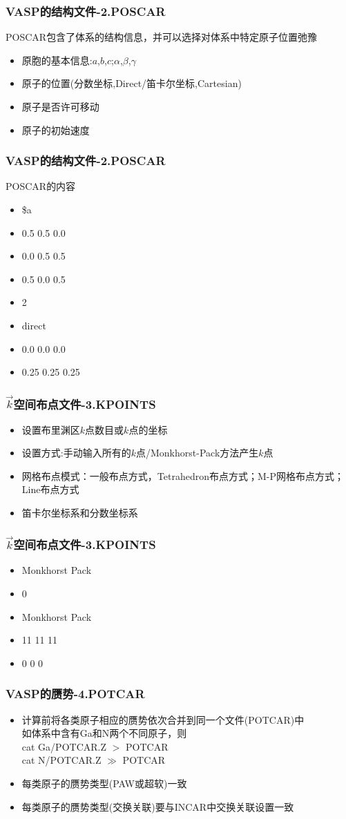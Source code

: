 \documentclass[cjk,slidestop,compress,mathserif,blue]{beamer}
\begin{document}
\frame
{
\frametitle{VASP的结构文件-2.POSCAR}
\textrm{POSCAR}包含了体系的结构信息，并可以选择对体系中特定原子位置弛豫
\begin{itemize}
   \setlength{\itemsep}{15pt}
	\item 原胞的基本信息:$a$,$b$,$c$;$\alpha$,$\beta$,$\gamma$
	\item 原子的位置(分数坐标,\textrm{Direct}/笛卡尔坐标,\textrm{Cartesian}) 
	\item 原子是否许可移动
	\item 原子的初始速度
\end{itemize}
}

\frame
{
\frametitle{VASP的结构文件-2.POSCAR}
\textrm{POSCAR}的内容
\begin{itemize}
   \setlength{\itemsep}{5pt}
   \item   \textrm{\$a}
	\item 0.5 0.5 0.0
	\item 0.0 0.5 0.5
	\item 0.5 0.0 0.5
	\item 2
	\item \textrm{direct}
	\item 0.0 0.0 0.0
	\item 0.25 0.25 0.25 
\end{itemize}
}

\frame
{
\frametitle{$\vec k$空间布点文件-3.KPOINTS}
\begin{itemize}
   \setlength{\itemsep}{15pt}
	\item 设置布里渊区$k$点数目或$k$点的坐标
	\item 设置方式:手动输入所有的$k$点/\textrm{Monkhorst-Pack}方法产生$k$点
	\item 网格布点模式：一般布点方式，\textrm{Tetrahedron}布点方式；\textrm{M-P}网格布点方式；\textrm{Line}布点方式
	\item 笛卡尔坐标系和分数坐标系
\end{itemize}
}

\frame
{
\frametitle{$\vec k$空间布点文件-3.KPOINTS}
\begin{itemize}
   \setlength{\itemsep}{5pt}
   	\item \textrm{Monkhorst Pack}
	\item 0
	\item \textrm{Monkhorst Pack}
	\item 11 11 11
	\item 0 0 0
\end{itemize}
}

\frame
{
\frametitle{VASP的赝势-4.POTCAR}
\begin{itemize}
   \setlength{\itemsep}{10pt}
	\item 计算前将各类原子相应的赝势依次合并到同一个文件(\textrm{POTCAR})中\\
		如体系中含有\textrm{Ga}和\textrm{N}两个不同原子，则\\
		\textrm{cat Ga/POTCAR.Z $>$ POTCAR}\\
		\textrm{cat N/POTCAR.Z $\gg$ POTCAR}
	\item 每类原子的赝势类型(\textrm{PAW}或超软)一致
	\item 每类原子的赝势类型(交换关联)要与\textrm{INCAR}中交换关联设置一致
\end{itemize}
}
\end{document}
